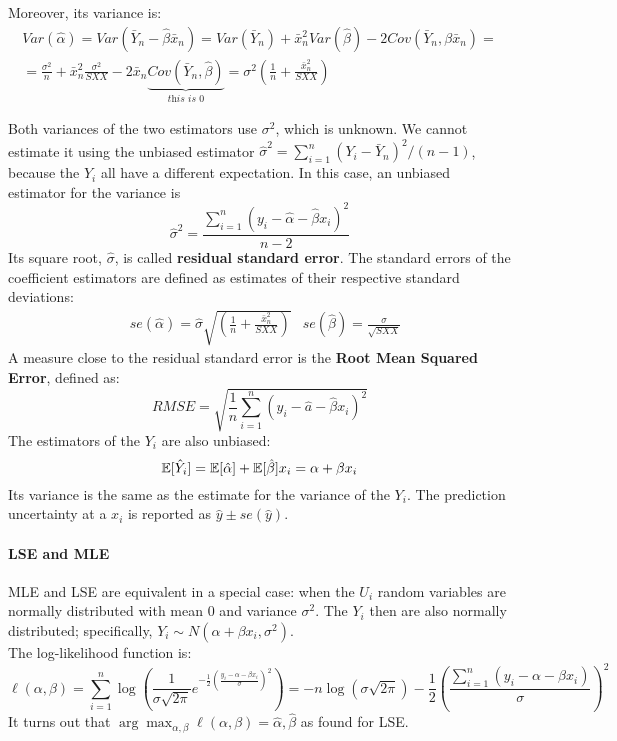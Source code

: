 Moreover, its variance is:
\begin{gather*}
    Var(\hat{\alpha}) = Var(\bar{Y}_n - \hat{\beta} \bar{x}_n) = Var(\bar{Y}_n) + \bar{x}_n^2 Var(\hat{\beta}) - 2 Cov(\bar{Y}_n, \beta \bar{x}_n) = \\
    = \frac{\sigma^2}{n} + \bar{x}_n^2 \frac{\sigma^2}{SXX} - 2 \bar{x}_n \underset{\textit{this is 0}}{\underbrace{Cov(\bar{Y}_n, \hat{\beta})}} = \sigma^2 \left( \frac{1}{n} + \frac{\bar{x}_n^2}{SXX}\right)
\end{gather*}

Both variances of the two estimators use $\sigma^2$, which is unknown. We cannot estimate it using the unbiased estimator $\hat{\sigma}^2 = \sum_{i=1}^n (Y_i - \bar{Y}_n)^2/(n-1)$, because the $Y_i$ all have a different expectation. In this case, an unbiased estimator for the variance is
\begin{equation*}
    \hat{\sigma}^2 = \frac{\sum_{i=1}^n (y_i - \hat{\alpha} - \hat{\beta} x_i)^2}{n-2}
\end{equation*}   
Its square root, $\hat{\sigma}$, is called \textbf{residual standard error}. The standard errors of the coefficient estimators are defined as estimates of their respective standard deviations:
\begin{align*}
    &se(\hat{\alpha}) = \hat{\sigma} \sqrt{\left( \frac{1}{n} + \frac{\bar{x}_n^2}{SXX} \right)} &se(\hat{\beta}) = \frac{\sigma}{\sqrt{SXX}}
\end{align*}
A measure close to the residual standard error is the \textbf{Root Mean Squared Error}, defined as:
\begin{equation*}
    RMSE = \sqrt{\frac{1}{n} \sum_{i=1}^n (y_i - \hat{a} - \hat{\beta}x_i)^2}
\end{equation*}   
The estimators of the $Y_i$ are also unbiased:
\begin{equation*}
    \mathbb{E}[\hat{Y}_i] = \mathbb{E}[\hat{\alpha}] + \mathbb{E}[\hat{\beta}] x_i = \alpha + \beta x_i
\end{equation*}   
Its variance is the same as the estimate for the variance of the $Y_i$. The prediction uncertainty at a $x_i$ is reported as $\hat{y} \pm se(\hat{y})$.

\paragraph{LSE and MLE}
MLE and LSE are equivalent in a special case: when the $U_i$ random variables are normally distributed with mean 0 and variance $\sigma^2$. The $Y_i$ then are also normally distributed; specifically, $Y_i \sim N(\alpha + \beta x_i, \sigma^2)$. \\
The log-likelihood function is:
\begin{equation*}
    \ell(\alpha, \beta) = \sum_{i=1}^n \log \left( \frac{1}{\sigma \sqrt{2 \pi}} e^{-\frac{1}{2} \left(\frac{y_i - \alpha - \beta x_i}{\sigma}\right)^2}\right) = -n \log(\sigma \sqrt{2 \pi}) - \frac{1}{2} \left(\frac{\sum_{i=1}^n (y_i - \alpha - \beta x_i)}{\sigma}\right)^2
\end{equation*}   
It turns out that $\arg \max_{\alpha, \beta} \ell(\alpha, \beta) = \hat{\alpha}, \hat{\beta}$ as found for LSE.

